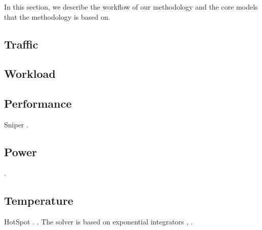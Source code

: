 In this section, we describe the workflow of our methodology and the core models
that the methodology is based on.

\subsection{Traffic}


\subsection{Workload}


\subsection{Performance}
Sniper \cite{carlson2011}.


\subsection{Power}
 \cite{li2009}.

\subsection{Temperature}
HotSpot \cite{skadron2004}.
 \cite{sridhar2010}.
The solver is based on exponential integrators \cite{hochbruck2010},
\cite{ukhov2012}.
